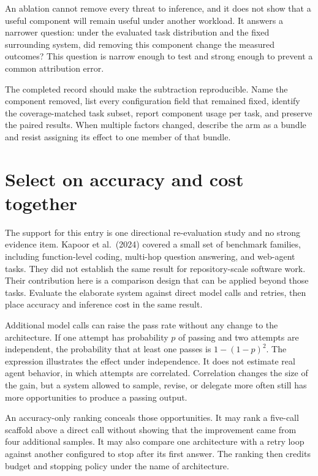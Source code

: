 An ablation cannot remove every threat to inference, and it does not show that a useful component will remain useful under another workload. It answers a narrower question: under the evaluated task distribution and the fixed surrounding system, did removing this component change the measured outcomes? This question is narrow enough to test and strong enough to prevent a common attribution error.

The completed record should make the subtraction reproducible. Name the component removed, list every configuration field that remained fixed, identify the coverage-matched task subset, report component usage per task, and preserve the paired results. When multiple factors changed, describe the arm as a bundle and resist assigning its effect to one member of that bundle.

\hypertarget{select-on-accuracy-and-cost-together}{%
\section{Select on accuracy and cost together}\label{select-on-accuracy-and-cost-together}}

The support for this entry is one directional re-evaluation study and no strong evidence item. Kapoor et al.~(2024) covered a small set of benchmark families, including function-level coding, multi-hop question answering, and web-agent tasks. They did not establish the same result for repository-scale software work. Their contribution here is a comparison design that can be applied beyond those tasks. Evaluate the elaborate system against direct model calls and retries, then place accuracy and inference cost in the same result.

Additional model calls can raise the pass rate without any change to the architecture. If one attempt has probability \(p\) of passing and two attempts are independent, the probability that at least one passes is \(1-(1-p)^2\). The expression illustrates the effect under independence. It does not estimate real agent behavior, in which attempts are correlated. Correlation changes the size of the gain, but a system allowed to sample, revise, or delegate more often still has more opportunities to produce a passing output.

An accuracy-only ranking conceals those opportunities. It may rank a five-call scaffold above a direct call without showing that the improvement came from four additional samples. It may also compare one architecture with a retry loop against another configured to stop after its first answer. The ranking then credits budget and stopping policy under the name of architecture.

